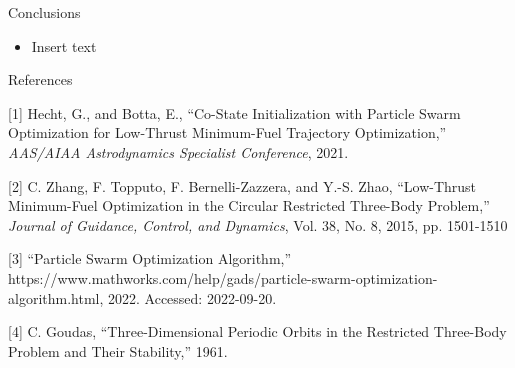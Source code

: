 \documentclass[aspectratio=169]{beamer}
\begin{document}
\begin{frame}{Conclusions}
    \begin{itemize}
        \item Insert text
    \end{itemize}
\end{frame}

\begin{frame}{References}

\scriptsize{
[1] Hecht, G., and Botta, E., ``Co-State Initialization with Particle Swarm Optimization for Low-Thrust Minimum-Fuel Trajectory Optimization,'' \textit{AAS/AIAA Astrodynamics Specialist Conference}, 2021.
}

\vspace{2mm}

\scriptsize{
[2] C. Zhang, F. Topputo, F. Bernelli-Zazzera, and Y.-S. Zhao, ``Low-Thrust Minimum-Fuel Optimization in the Circular Restricted Three-Body Problem,'' \textit{Journal of Guidance, Control, and Dynamics}, Vol. 38, No. 8, 2015, pp. 1501-1510
}

\vspace{2mm}

\scriptsize{
[3] ``Particle Swarm Optimization Algorithm,'' https://www.mathworks.com/help/gads/particle-swarm-optimization-algorithm.html, 2022. Accessed: 2022-09-20.
}

\vspace{2mm}

\scriptsize
[4] C. Goudas, ``Three-Dimensional Periodic Orbits in the Restricted Three-Body Problem and Their Stability,'' 1961.
\end{frame}
\end{document}
